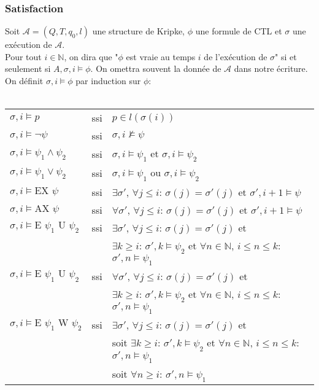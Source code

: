 \documentclass[10pt,a4paper]{article}
\begin{document}
\subsubsection{Satisfaction}
Soit $\mathcal{A} = (Q,T,q_0,l)$ une structure de Kripke, $\phi$ une formule de CTL et $\sigma$ une exécution de $\mathcal{A}$.\\
Pour tout $i \in \mathbb{N}$, on dira que "$\phi$ est vraie au temps $i$ de l'exécution de $\sigma$" si et seulement si $A,\sigma,i \vDash \phi$. On omettra souvent la donnée de $\mathcal{A}$ dans notre écriture.\\
On définit $\sigma,i \vDash \phi$ par induction sur $\phi$:\\
\\
\begin{tabular}{lcl}
$\sigma,i \vDash p$ &ssi& $p \in l (\sigma(i))$\\
$\sigma,i \vDash \neg \psi$ &ssi& $\sigma,i \nvDash \psi$\\
$\sigma,i \vDash \psi_1 \land \psi_2$ &ssi& $\sigma,i \vDash \psi_1$ et $\sigma,i \vDash \psi_2$\\
$\sigma,i \vDash \psi_1 \lor \psi_2$ &ssi& $\sigma,i \vDash \psi_1$ ou $\sigma,i \vDash \psi_2$\\
$\sigma,i \vDash \mbox{EX } \psi$ &ssi& $\exists \sigma'$, $\forall j \leq i$: $\sigma(j) = \sigma'(j)$ et $\sigma',i+1 \vDash \psi$\\
$\sigma,i \vDash \mbox{AX } \psi$ &ssi& $\forall \sigma'$, $\forall j \leq i$: $\sigma(j) = \sigma'(j)$ et $\sigma',i+1 \vDash \psi$\\

$\sigma,i \vDash \mbox{E } \psi_1 \mbox{ U } \psi_2$ &ssi& $\exists \sigma'$, $\forall j \leq i$: $\sigma(j) = \sigma'(j)$ et\\
& & $\exists k \geq i$: $\sigma',k\vDash \psi_2$ et $\forall n \in \mathbb{N}$, $i \leq n \leq k$: $\sigma',n \vDash \psi_1$\\

$\sigma,i \vDash \mbox{E } \psi_1 \mbox{ U } \psi_2$ &ssi& $\forall \sigma'$, $\forall j \leq i$: $\sigma(j) = \sigma'(j)$ et\\
& & $\exists k \geq i$: $\sigma',k\vDash \psi_2$ et $\forall n \in \mathbb{N}$, $i \leq n \leq k$: $\sigma',n \vDash \psi_1$\\

$\sigma,i \vDash \mbox{E } \psi_1 \mbox{ W } \psi_2$ &ssi& $\exists \sigma'$, $\forall j \leq i$: $\sigma(j) = \sigma'(j)$ et\\
& & soit $\exists k \geq i$: $\sigma',k\vDash \psi_2$ et $\forall n \in \mathbb{N}$, $i \leq n \leq k$: $\sigma',n \vDash \psi_1$\\
& & soit $\forall n \geq i$: $\sigma',n \vDash \psi_1$\\


\end{tabular}
\end{document}
